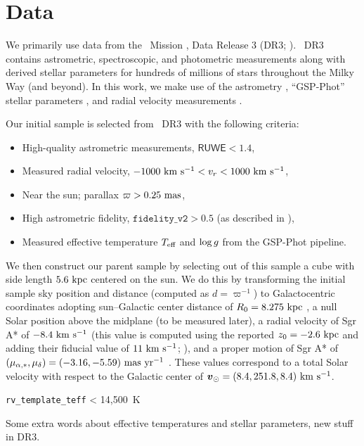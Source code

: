\section{Data} \label{sec:data}

We primarily use data from the \gaia\ Mission \citep{Gaia-Collaboration:2016}, Data
Release 3 (DR3; \citealt{}).
\gaia\ DR3 contains astrometric, spectroscopic, and photometric measurements along with
derived stellar parameters for hundreds of millions of stars throughout the Milky Way
(and beyond).
In this work, we make use of the astrometry \citep{todo}, ``GSP-Phot'' stellar
parameters \citep{todo}, and radial velocity measurements \citep{todo}.

Our initial sample is selected from \gaia\ DR3 with the following criteria:
\begin{itemize}
    \item High-quality astrometric measurements, $\textsf{RUWE} < 1.4$,
    \item Measured radial velocity, $-1000~\mathrm{km}~\mathrm{s}^{-1} < v_r < 1000~\mathrm{km}~\mathrm{s}^{-1}$,
    \item Near the sun; parallax $\varpi > 0.25~\mathrm{mas}$,
    \item High astrometric fidelity, $\mathtt{fidelity\_v2} > 0.5$ (as described in
    \citealt{Rybizki:2022}),
    \item Measured effective temperature $T_{\textrm{eff}}$ and $\log g$ from the GSP-Phot pipeline.
\end{itemize}
We then construct our parent sample by selecting out of this sample a cube with side
length $5.6~\mathrm{kpc}$ centered on the sun.
We do this by transforming the initial sample sky position and distance (computed as
$d=\varpi^{-1}$) to Galactocentric coordinates adopting sun–Galactic center distance of
$R_0 = 8.275~\mathrm{kpc}$ \citep{Gravity-Collaboration:2021}, a null Solar position above the
midplane (to be measured later), a radial velocity of Sgr A* of $-8.4~\mathrm{km}~\mathrm{s}^{-1}$ (this value
is computed using the reported $z_0 = -2.6~\mathrm{kpc}$ and adding their fiducial value of
$11~\mathrm{km}~\mathrm{s}^{-1}$; \citealt{Gravity-Collaboration:2021}), and a proper motion of Sgr A* of
$(\mu_{\alpha,*}, \mu_\delta) = (-3.16, -5.59)~\mathrm{mas}~\mathrm{yr}^{-1}$ \citep{Reid:2020}. These values
correspond to a total Solar velocity with respect to the Galactic center of
$\boldsymbol{v}_\odot = (8.4, 251.8, 8.4)~\mathrm{km}~\mathrm{s}^{-1}$.

\texttt{rv\_template\_teff} < 14,500~K


Some extra words about effective temperatures and stellar parameters, new stuff in DR3.

